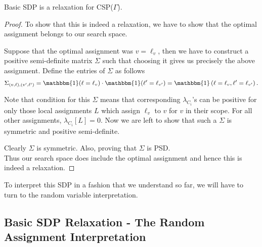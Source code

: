 \begin{theorem}\label{sdprelaxproof}
Basic SDP is a relaxation for CSP($\Gamma$).
\end{theorem}
\begin{proof}
To show that this is indeed a relaxation, we have to show that the optimal assignment belongs to our search space. 

Suppose that the optimal assignment was $v=\ell_v$, then we have to construct a positive semi-definite matrix $\Sigma$ such that choosing it gives us precisely the above assignment. 
Define the entries of $\Sigma$ as follows 
$$ \Sigma_{\lrb{v, \ell},\lrb{v', \ell'}} = \mathbbm{1}(\ell = \ell_v) \cdot \mathbbm{1}(\ell' = \ell_{v'}) = \mathbbm{1}\lrb{\ell = \ell_v, \ell'= \ell_{v'}}.$$ 

Note that \cite{lambdaandsigma} condition for this $\Sigma$ means that corresponding $\lambda_{C_i}$'s can be positive for only those local assignments $L$ which assign $\ell_v$ to $v$ for $v$ in their scope. 
For all other assignments, $\lambda_{C_i}[L]=0$.
Now we are left to show that such a $\Sigma$ is symmetric and positive semi-definite.

Clearly $\Sigma$ is symmetric. 
Also, 
proving that $\Sigma$ is PSD. \\
Thus our search space does include the optimal assignment and hence this is indeed a relaxation.
\end{proof}

To interpret this SDP in a fashion that we understand so far, we will have to turn to the random variable interpretation. 

\subsection{Basic SDP Relaxation - The Random Assignment Interpretation}

